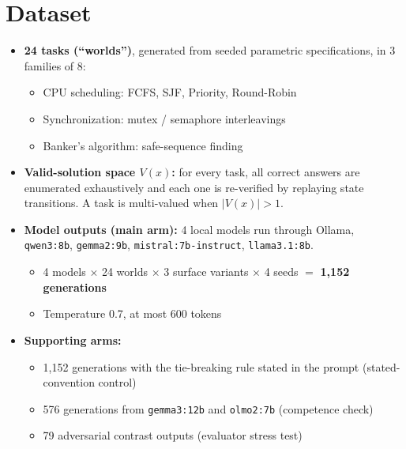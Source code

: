 \documentclass[11pt,a4paper]{article}
\begin{document}
\section{Dataset}
\begin{itemize}
\item \textbf{24 tasks (``worlds'')}, generated from seeded parametric specifications, in 3 families of 8:
  \begin{itemize}
  \item CPU scheduling: FCFS, SJF, Priority, Round-Robin
  \item Synchronization: mutex / semaphore interleavings
  \item Banker's algorithm: safe-sequence finding
  \end{itemize}
\item \textbf{Valid-solution space $V(x)$:} for every task, all correct answers are enumerated exhaustively and each one is re-verified by replaying state transitions. A task is multi-valued when $|V(x)|>1$.
\item \textbf{Model outputs (main arm):} 4 local models run through Ollama, \texttt{qwen3:8b}, \texttt{gemma2:9b}, \texttt{mistral:7b-instruct}, \texttt{llama3.1:8b}.
  \begin{itemize}
  \item 4 models $\times$ 24 worlds $\times$ 3 surface variants $\times$ 4 seeds $=$ \textbf{1,152 generations}
  \item Temperature 0.7, at most 600 tokens
  \end{itemize}
\item \textbf{Supporting arms:}
  \begin{itemize}
  \item 1,152 generations with the tie-breaking rule stated in the prompt (stated-convention control)
  \item 576 generations from \texttt{gemma3:12b} and \texttt{olmo2:7b} (competence check)
  \item 79 adversarial contrast outputs (evaluator stress test)
  \end{itemize}
\end{itemize}

\end{document}
